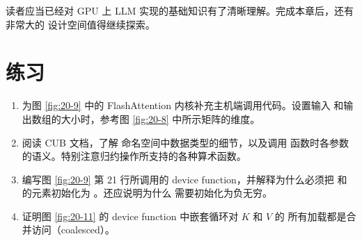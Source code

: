 读者应当已经对 GPU 上 LLM 实现的基础知识有了清晰理解。完成本章后，还有非常大的
设计空间值得继续探索。

\section{练习}
\label{sec:ch20-exercises}

\begin{enumerate}[label=\arabic*.,leftmargin=2.5em]
  \item 为图 \ref{fig:20-9} 中的 FlashAttention 内核补充主机端调用代码。设置输入
  和输出数组的大小时，参考图 \ref{fig:20-8} 中所示矩阵的维度。
  \item 阅读 CUB 文档，了解  命名空间中数据类型的细节，以及调用
   函数时各参数的语义。特别注意归约操作所支持的各种算术函数。
  \item 编写图 \ref{fig:20-9} 第 21 行所调用的  device
  function，并解释为什么必须把  和  的元素初始化为
  。还应说明为什么  需要初始化为负无穷。
  \item 证明图 \ref{fig:20-11} 的 device function 中嵌套循环对 $K$ 和 $V$ 的
  所有加载都是合并访问（coalesced）。
\end{enumerate}

